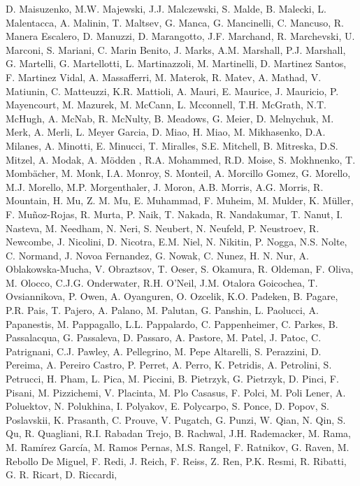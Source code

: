 D. Maisuzenko,
M.W. Majewski,
J.J. Malczewski,
S. Malde,
B. Malecki,
L. Malentacca,
A. Malinin,
T. Maltsev,
G. Manca,
G. Mancinelli,
C. Mancuso,
R. Manera Escalero,
D. Manuzzi,
D. Marangotto,
J.F. Marchand,
R. Marchevski,
U. Marconi,
S. Mariani,
C. Marin Benito,
J. Marks,
A.M. Marshall,
P.J. Marshall,
G. Martelli,
G. Martellotti,
L. Martinazzoli,
M. Martinelli,
D. Martinez Santos,
F. Martinez Vidal,
A. Massafferri,
M. Materok,
R. Matev,
A. Mathad,
V. Matiunin,
C. Matteuzzi,
K.R. Mattioli,
A. Mauri,
E. Maurice,
J. Mauricio,
P. Mayencourt,
M. Mazurek,
M. McCann,
L. Mcconnell,
T.H. McGrath,
N.T. McHugh,
A. McNab,
R. McNulty,
B. Meadows,
G. Meier,
D. Melnychuk,
M. Merk,
A. Merli,
L. Meyer Garcia,
D. Miao,
H. Miao,
M. Mikhasenko,
D.A. Milanes,
A. Minotti,
E. Minucci,
T. Miralles,
S.E. Mitchell,
B. Mitreska,
D.S. Mitzel,
A. Modak,
A. M{\"o}dden ,
R.A. Mohammed,
R.D. Moise,
S. Mokhnenko,
T. Momb{\"a}cher,
M. Monk,
I.A. Monroy,
S. Monteil,
A. Morcillo Gomez,
G. Morello,
M.J. Morello,
M.P. Morgenthaler,
J. Moron,
A.B. Morris,
A.G. Morris,
R. Mountain,
H. Mu,
Z. M.  Mu,
E. Muhammad,
F. Muheim,
M. Mulder,
K. M{\"u}ller,
F. Mu{\~n}oz-Rojas,
R. Murta,
P. Naik,
T. Nakada,
R. Nandakumar,
T. Nanut,
I. Nasteva,
M. Needham,
N. Neri,
S. Neubert,
N. Neufeld,
P. Neustroev,
R. Newcombe,
J. Nicolini,
D. Nicotra,
E.M. Niel,
N. Nikitin,
P. Nogga,
N.S. Nolte,
C. Normand,
J. Novoa Fernandez,
G. Nowak,
C. Nunez,
H. N.  Nur,
A. Oblakowska-Mucha,
V. Obraztsov,
T. Oeser,
S. Okamura,
R. Oldeman,
F. Oliva,
M. Olocco,
C.J.G. Onderwater,
R.H. O'Neil,
J.M. Otalora Goicochea,
T. Ovsiannikova,
P. Owen,
A. Oyanguren,
O. Ozcelik,
K.O. Padeken,
B. Pagare,
P.R. Pais,
T. Pajero,
A. Palano,
M. Palutan,
G. Panshin,
L. Paolucci,
A. Papanestis,
M. Pappagallo,
L.L. Pappalardo,
C. Pappenheimer,
C. Parkes,
B. Passalacqua,
G. Passaleva,
D. Passaro,
A. Pastore,
M. Patel,
J. Patoc,
C. Patrignani,
C.J. Pawley,
A. Pellegrino,
M. Pepe Altarelli,
S. Perazzini,
D. Pereima,
A. Pereiro Castro,
P. Perret,
A. Perro,
K. Petridis,
A. Petrolini,
S. Petrucci,
H. Pham,
L. Pica,
M. Piccini,
B. Pietrzyk,
G. Pietrzyk,
D. Pinci,
F. Pisani,
M. Pizzichemi,
V. Placinta,
M. Plo Casasus,
F. Polci,
M. Poli Lener,
A. Poluektov,
N. Polukhina,
I. Polyakov,
E. Polycarpo,
S. Ponce,
D. Popov,
S. Poslavskii,
K. Prasanth,
C. Prouve,
V. Pugatch,
G. Punzi,
W. Qian,
N. Qin,
S. Qu,
R. Quagliani,
R.I. Rabadan Trejo,
B. Rachwal,
J.H. Rademacker,
M. Rama,
M.  Ram\'{i}rez Garc\'{i}a,
M. Ramos Pernas,
M.S. Rangel,
F. Ratnikov,
G. Raven,
M. Rebollo De Miguel,
F. Redi,
J. Reich,
F. Reiss,
Z. Ren,
P.K. Resmi,
R. Ribatti,
G. R.  Ricart,
D. Riccardi,
